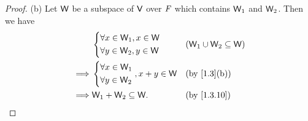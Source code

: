 \begin{proof}{(b)}
  Let \(\mathsf{W}\) be a subspace of \(\mathsf{V}\) over \(\mathit{F}\) which contains \(\mathsf{W}_{1}\) and \(\mathsf{W}_{2}\).
  Then we have
  \begin{align*}
             & \begin{dcases}
      \forall x \in \W_{1}, x \in \W \\
      \forall y \in \W_{2}, y \in \W
    \end{dcases}               &  & (\W_{1} \cup \W_{2} \subseteq \W) \\
    \implies & \begin{dcases}
      \forall x \in \W_{1} \\
      \forall y \in \W_{2}
    \end{dcases}, x + y \in \W &  & \text{(by \cref{1.3}(b))}         \\
    \implies & \W_{1} + \W_{2} \subseteq \W.            &  & \text{(by \cref{1.3.10})}
  \end{align*}
\end{proof}